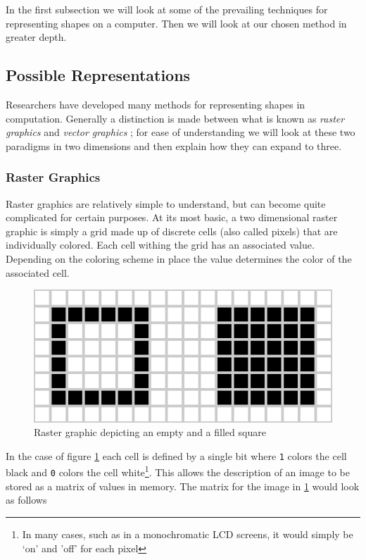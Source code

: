 \documentclass[authoryearcitations]{UoYCSproject}
\begin{document}
In the first subsection we will look at some of the prevailing techniques for representing shapes on a computer. Then we will 
look at our chosen method in greater depth. 

\subsection{Possible Representations}
Researchers have developed many methods for representing shapes in computation. Generally a distinction is made between what is 
known as \emph{raster graphics} and \emph{vector graphics} \cite{bors}; for ease of understanding we will look at these two 
paradigms in two dimensions and then explain how they can expand to three. 

\subsubsection{Raster Graphics}
Raster graphics are relatively simple to understand, but can become quite complicated for certain purposes. At its most basic, 
a two dimensional raster graphic is simply a grid made up of discrete cells (also called pixels) that are individually colored.  
Each cell withing the grid has an associated value. Depending on the coloring scheme in place the value determines the 
color of the associated cell. 

\begin{figure}[h]
  \centering
  \includegraphics[scale=1.0]{figures/rasterSquare.eps}
    \caption{Raster graphic depicting an empty and a filled square}
  \label{rasterSquare}
\end{figure}

In the case of figure \ref{rasterSquare} each cell is defined by a single bit where \verb+1+ colors the cell black and
\verb+0+ colors the cell white\footnote{In many cases, such as in a monochromatic LCD screens, it would simply be 
`on' and 'off' for each pixel}. This allows the description of an image to be stored as a matrix of values in memory. 
The matrix for the image in \ref{rasterSquare} would look as follows
\end{document}

